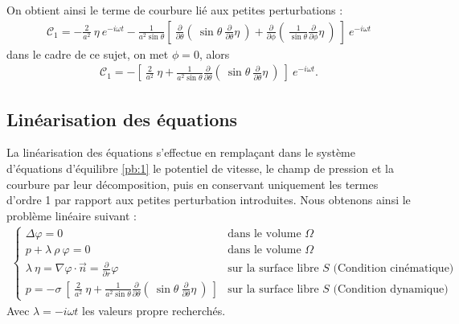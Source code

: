 \documentclass[a4paper]{report}
\begin{document}
On obtient ainsi le terme de courbure lié aux petites perturbations :
\begin{eqnarray}
\mathscr{C}_1 = - \frac{2}{a^2} \ \eta \ e^{- i \omega t}
                - \frac{1}{a^2 \sin\theta} \left[\ \frac{\partial}{\partial \theta}(\ \sin\theta \ \frac{\partial}{\partial \theta} \eta \ )
                                                    + \frac{\partial}{\partial \phi}(\ \frac{1}{\sin\theta} \frac{\partial}{\partial \phi} \eta \ )\ \right]\ e^{- i \omega t}
\end{eqnarray}
dans le cadre de ce sujet, on met $\phi = 0$, alors
\begin{eqnarray}
\mathscr{C}_1 = - \left[\ \frac{2}{a^2} \ \eta
                          + \frac{1}{a^2 \sin\theta} \frac{\partial}{\partial \theta}(\ \sin\theta \ \frac{\partial}{\partial \theta} \eta \ )\ \right]\ e^{- i \omega t}.
\end{eqnarray}
\subsection{Linéarisation des équations}
La linéarisation des équations s'effectue en remplaçant dans le système d'équations d'équilibre \eqref{pb:1} le potentiel de vitesse, le champ de pression et la courbure par leur décomposition, puis en conservant uniquement les termes d'ordre 1 par rapport aux petites perturbation introduites. Nous obtenons ainsi le problème linéaire suivant :
\begin{eqnarray}\label{pb:2}         %
\left\{                              %
\begin{array}{lll}                   %
\Delta \varphi = 0                                                                                     & \text{dans le volume $\Omega$}    \\%
p + \lambda\ \rho\ \varphi = 0                                                        & \text{dans le volume $\Omega$}    \\%
\lambda\ \eta = \nabla \varphi \cdot \vec{n} = \frac{\partial}{\partial r} \varphi     & \text{sur la surface libre $S$ (Condition cinématique)}      \\
p = - \sigma\ \left[\ \frac{2}{a^2} \ \eta
                      + \frac{1}{a^2 \sin\theta} \frac{\partial}{\partial \theta}(\ \sin\theta \ \frac{\partial}{\partial \theta} \eta \ )\ \right]
& \text{sur la surface libre $S$ (Condition dynamique)}   %
\end{array}                          %
\right.                              %
\end{eqnarray}                       %
Avec $\lambda = - i \omega t$ les valeurs propre recherchés.
\end{document}
